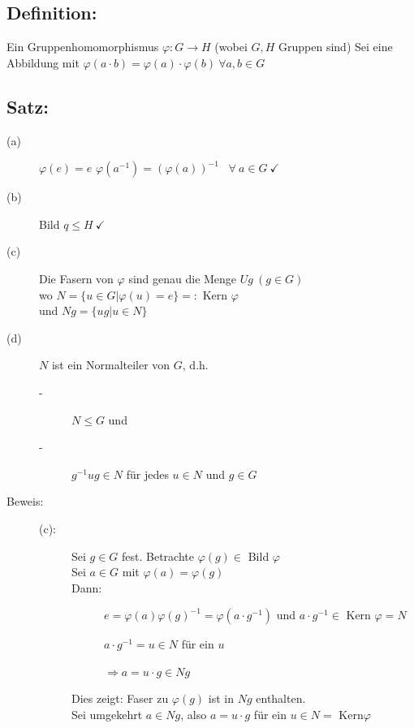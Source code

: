\subsection{Definition:}
Ein Gruppenhomomorphismus $\varphi: G \rightarrow H$ (wobei $G,H$ Gruppen sind) Sei eine Abbildung mit $\varphi(a \cdot b) = \varphi (a) \cdot \varphi (b) \ \forall a,b \in G$
%
%
%
\subsection{Satz:}
\begin{description}
	\item[(a)] $\varphi(e)=e$ \qquad $\varphi(a^{-1}) = (\varphi(a))^{-1}$ \qquad\ $\forall \ a \in G \ \checkmark$
	\item[(b)] Bild $q \leq H \ \checkmark$
	\item[(c)] Die Fasern von $\varphi$ sind genau die Menge $Ug \ (g \in G)$\\
			wo $N=\{u \in G|\varphi(u)=e\}=:$ Kern $\varphi$\\
			und $Ng = \{ug|u \in N\}$
	\item[(d)] $N$ ist ein Normalteiler von $G$, d.h.\\
	\begin{description}
		\item[-] $N \leq G$ und
		\item[-] $g^{-1}ug \in N$ für jedes $u \in N$ und $g \in G$
	\end{description}
	\item[Beweis:] \quad
	\begin{description}
		\item[(c):] Sei $g \in G$ fest. Betrachte $\varphi(g) \in$ Bild $\varphi$\\
				Sei $a \in G$ mit $\varphi(a) = \varphi(g)$\\
				Dann:	
				\begin{description}
					\item[]$e = \varphi(a)\varphi(g)^{-1}=\varphi(a \cdot g^{-1})$ und $a \cdot g^{-1} \in$ 
						Kern $\varphi=N$
					\item[]$a \cdot g^{-1}= u \in N$ für ein $u$
					\item[]$\Rightarrow a=u \cdot g \in Ng$
				\end{description}
				Dies zeigt: Faser zu $\varphi(g)$ ist in $Ng$ enthalten.\\
				Sei umgekehrt $a \in Ng$, also $a= u \cdot g$ für ein $u \in N =$ Kern$\varphi$\\

\end{description}
\end{description}
